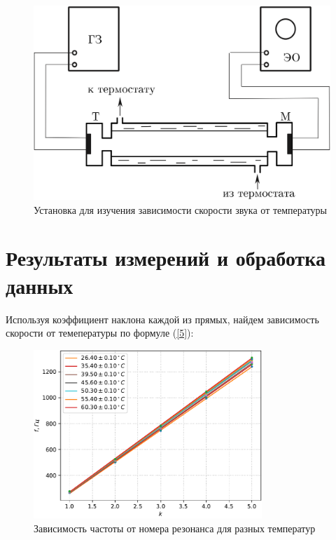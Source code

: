 \documentclass[a4paper,12pt]{article} %
\begin{document}
\begin{figure}[h!]
    \centering
    \includegraphics[width=\textwidth]{установка2.png}
    \caption{Установка для изучения зависимости скорости звука от температуры}\label{setup}
	\label{setup2}
\end{figure}

\clearpage
\newpage

\section{Результаты измерений и обработка данных}

Используя коэффициент наклона каждой из прямых, найдем зависимость скорости от темепературы по формуле (\ref{5}):

\begin{figure}[h!]
    \centering
    \includegraphics[width=0.77\textwidth]{f.pdf}
    \caption{Зависимость частоты от номера резонанса для разных температур}
\end{figure}
\end{document}
